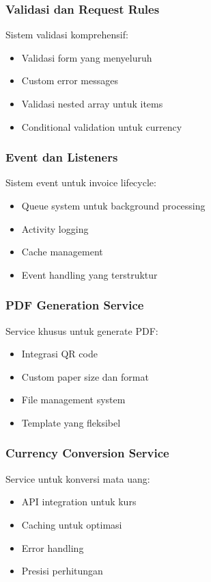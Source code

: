 \documentclass[a4paper]{report}
\begin{document}
\subsubsection{Validasi dan Request Rules}
Sistem validasi komprehensif:
\begin{itemize}
\item Validasi form yang menyeluruh
\item Custom error messages
\item Validasi nested array untuk items
\item Conditional validation untuk currency
\end{itemize}

\subsubsection{Event dan Listeners}
Sistem event untuk invoice lifecycle:
\begin{itemize}
\item Queue system untuk background processing
\item Activity logging
\item Cache management
\item Event handling yang terstruktur
\end{itemize}

\subsubsection{PDF Generation Service}
Service khusus untuk generate PDF:
\begin{itemize}
\item Integrasi QR code
\item Custom paper size dan format
\item File management system
\item Template yang fleksibel
\end{itemize}

\subsubsection{Currency Conversion Service}
Service untuk konversi mata uang:
\begin{itemize}
\item API integration untuk kurs
\item Caching untuk optimasi
\item Error handling
\item Presisi perhitungan
\end{itemize}
\end{document}
